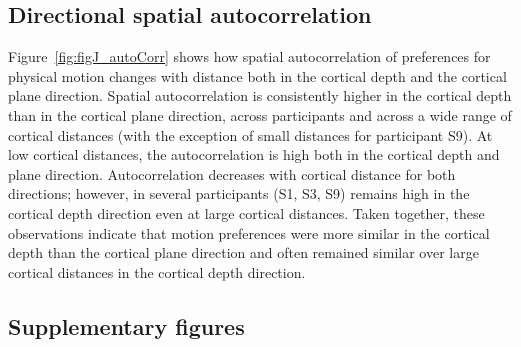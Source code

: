 \subsection{Directional spatial autocorrelation}
\label{sec:auto}
Figure~\ref{fig:figJ_autoCorr} shows how spatial autocorrelation of preferences for physical motion changes with distance both in the cortical depth and the cortical plane direction. Spatial autocorrelation is consistently higher in the cortical depth than in the cortical plane direction, across participants and across a wide range of cortical distances (with the exception of small distances for participant S9). At low cortical distances, the autocorrelation is high both in the cortical depth and plane direction. Autocorrelation decreases with cortical distance for both directions; however, in several participants (S1, S3, S9) remains high in the cortical depth direction even at large cortical distances. Taken together, these observations indicate that motion preferences were more similar in the cortical depth than the cortical plane direction and often remained similar over large cortical distances in the cortical depth direction.

\beginsupplement

\clearpage
\subsection{Supplementary figures}

